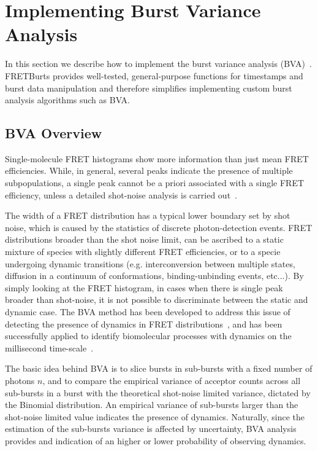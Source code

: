 \section{Implementing Burst Variance Analysis}

\label{sec:bva}
In this section we describe how to implement the burst variance analysis (BVA)~\cite{Torella_2011}.
FRETBurts provides well-tested, general-purpose functions for timestamps and burst data 
manipulation and therefore simplifies implementing custom burst analysis algorithms such as BVA.

\subsection{BVA Overview}
Single-molecule FRET histograms show more information than just mean FRET efficiencies. 
While, in general, several peaks indicate the presence of multiple subpopulations, 
a single peak cannot be a priori associated with a single FRET efficiency,
unless a detailed shot-noise analysis is carried out~\cite{Nir_2006,Antonik2006}.

The width of a FRET distribution has a typical lower boundary set by shot noise, which is caused by
the statistics of discrete photon-detection events. FRET distributions broader than the shot noise limit, 
can be ascribed to a static mixture of species with slightly different FRET efficiencies, 
or to a specie undergoing dynamic transitions (e.g. interconversion between multiple states,
diffusion in a continuum of conformations, binding-unbinding events, etc...).
By simply looking at the FRET histogram,  in cases when there is single peak broader than shot-noise, 
it is not possible to discriminate between the static and dynamic case.
The BVA method has been developed to address this issue of detecting the presence of dynamics 
in FRET distributions~\cite{Torella_2011}, 
and has been successfully applied to identify biomolecular processes with 
dynamics on the millisecond time-scale~\cite{Torella_2011, Robb_2013}.

The basic idea behind BVA is to slice bursts in sub-bursts with a fixed number of photons $n$,
and to compare the empirical variance of acceptor counts across all sub-bursts in a burst 
with the theoretical shot-noise limited variance, dictated by the Binomial distribution.
An empirical variance of sub-bursts larger than the shot-noise limited value indicates
the presence of dynamics. Naturally, since the estimation of the sub-bursts variance is affected
by uncertainty, BVA analysis provides and indication of an higher or lower probability
of observing dynamics.

